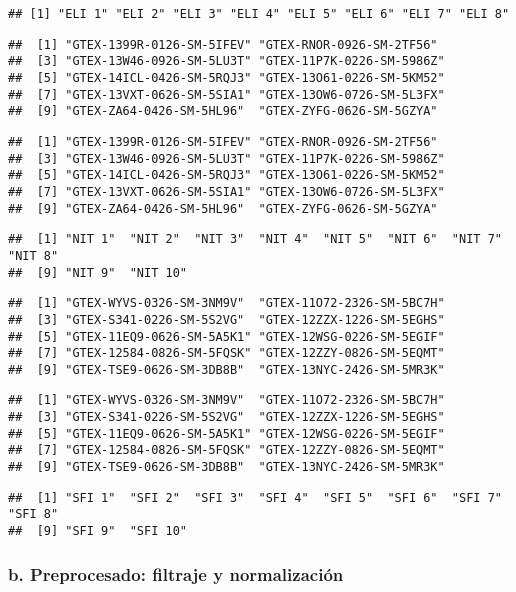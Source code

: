 \documentclass[
]{article}
\begin{document}
\begin{verbatim}
## [1] "ELI 1" "ELI 2" "ELI 3" "ELI 4" "ELI 5" "ELI 6" "ELI 7" "ELI 8"
\end{verbatim}

\begin{verbatim}
##  [1] "GTEX-1399R-0126-SM-5IFEV" "GTEX-RNOR-0926-SM-2TF56" 
##  [3] "GTEX-13W46-0926-SM-5LU3T" "GTEX-11P7K-0226-SM-5986Z"
##  [5] "GTEX-14ICL-0426-SM-5RQJ3" "GTEX-13O61-0226-SM-5KM52"
##  [7] "GTEX-13VXT-0626-SM-5SIA1" "GTEX-13OW6-0726-SM-5L3FX"
##  [9] "GTEX-ZA64-0426-SM-5HL96"  "GTEX-ZYFG-0626-SM-5GZYA"
\end{verbatim}

\begin{verbatim}
##  [1] "GTEX-1399R-0126-SM-5IFEV" "GTEX-RNOR-0926-SM-2TF56" 
##  [3] "GTEX-13W46-0926-SM-5LU3T" "GTEX-11P7K-0226-SM-5986Z"
##  [5] "GTEX-14ICL-0426-SM-5RQJ3" "GTEX-13O61-0226-SM-5KM52"
##  [7] "GTEX-13VXT-0626-SM-5SIA1" "GTEX-13OW6-0726-SM-5L3FX"
##  [9] "GTEX-ZA64-0426-SM-5HL96"  "GTEX-ZYFG-0626-SM-5GZYA"
\end{verbatim}

\begin{verbatim}
##  [1] "NIT 1"  "NIT 2"  "NIT 3"  "NIT 4"  "NIT 5"  "NIT 6"  "NIT 7"  "NIT 8" 
##  [9] "NIT 9"  "NIT 10"
\end{verbatim}

\begin{verbatim}
##  [1] "GTEX-WYVS-0326-SM-3NM9V"  "GTEX-11O72-2326-SM-5BC7H"
##  [3] "GTEX-S341-0226-SM-5S2VG"  "GTEX-12ZZX-1226-SM-5EGHS"
##  [5] "GTEX-11EQ9-0626-SM-5A5K1" "GTEX-12WSG-0226-SM-5EGIF"
##  [7] "GTEX-12584-0826-SM-5FQSK" "GTEX-12ZZY-0826-SM-5EQMT"
##  [9] "GTEX-TSE9-0626-SM-3DB8B"  "GTEX-13NYC-2426-SM-5MR3K"
\end{verbatim}

\begin{verbatim}
##  [1] "GTEX-WYVS-0326-SM-3NM9V"  "GTEX-11O72-2326-SM-5BC7H"
##  [3] "GTEX-S341-0226-SM-5S2VG"  "GTEX-12ZZX-1226-SM-5EGHS"
##  [5] "GTEX-11EQ9-0626-SM-5A5K1" "GTEX-12WSG-0226-SM-5EGIF"
##  [7] "GTEX-12584-0826-SM-5FQSK" "GTEX-12ZZY-0826-SM-5EQMT"
##  [9] "GTEX-TSE9-0626-SM-3DB8B"  "GTEX-13NYC-2426-SM-5MR3K"
\end{verbatim}

\begin{verbatim}
##  [1] "SFI 1"  "SFI 2"  "SFI 3"  "SFI 4"  "SFI 5"  "SFI 6"  "SFI 7"  "SFI 8" 
##  [9] "SFI 9"  "SFI 10"
\end{verbatim}

\subsubsection{b. Preprocesado: filtraje y normalización}
\end{document}
